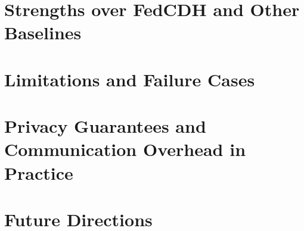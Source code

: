 \section{Strengths over FedCDH and Other Baselines}
\lipsum[2]

\section{Limitations and Failure Cases}
\lipsum[2]

\section{Privacy Guarantees and Communication Overhead in Practice}
\lipsum[2]

\section{Future Directions}
\lipsum[2]
